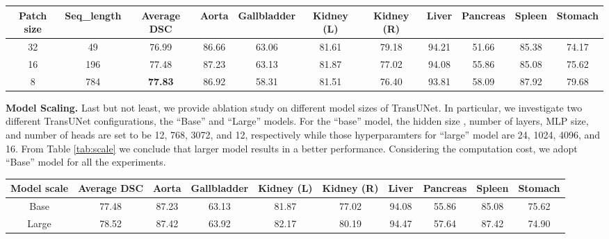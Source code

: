 \documentclass[runningheads]{llncs}
\begin{document}
\vspace{-1em}
\begin{table*}[]
\centering
\footnotesize
\resizebox{\textwidth}{!}
{
\begin{tabular}{c|c|c|cccccccc}
\hline
Patch size   & Seq\_length       & Average DSC    & Aorta & Gallbladder & Kidney (L) & Kidney (R) & Liver & Pancreas & Spleen & Stomach \\ \hline
32 & 49   & 76.99 & 86.66 & 63.06       & 81.61      & 79.18      & 94.21 & 51.66    & 85.38  & 74.17   \\ 
16  & 196 & 77.48 & 87.23 & 63.13       & 81.87      & 77.02      & 94.08 & 55.86    & 85.08  & 75.62   \\
8  & 784 & \textbf{77.83} & 86.92 & 58.31       & 81.51      & 76.40      & 93.81 & 58.09    & 87.92  & 79.68   \\ \hline
\end{tabular}
} \caption{Ablation study on the patch size and the sequence length.
\vspace{-0.5em}}
\label{tab:ps}
\end{table*}

\vspace{-1.5em}
\noindent\textbf{Model Scaling.}
Last but not least, we provide ablation study on different model sizes of TransUNet. 
In particular, we investigate two different TransUNet configurations, the ``Base'' and ``Large'' models. For the ``base'' model, the hidden size , number of layers, MLP size, and number of heads are set to be 12, 768, 3072, and 12, respectively while those hyperparamters for ``large'' model are 24, 1024, 4096, and 16. From Table \ref{tab:scale} we conclude that larger model results in a better performance. Considering the computation cost, we adopt ``Base'' model for all the experiments.

\vspace{-1em}
\begin{table*}[]
\footnotesize
\centering
\resizebox{\textwidth}{!}
{
\begin{tabular}{c|c|cccccccc}
\hline
Model scale          & Average DSC    & Aorta & Gallbladder & Kidney (L) & Kidney (R) & Liver & Pancreas & Spleen & Stomach \\ \hline
Base   & 77.48 & 87.23 & 63.13       & 81.87      & 77.02      & 94.08 & 55.86    & 85.08  & 75.62   \\
Large & 78.52 & 87.42 & 63.92       & 82.17      & 80.19      & 94.47 & 57.64    & 87.42  & 74.90   \\ \hline
\end{tabular}
}
\caption{Ablation study on the model scale.}
\label{tab:scale}
\end{table*}
\end{document}
